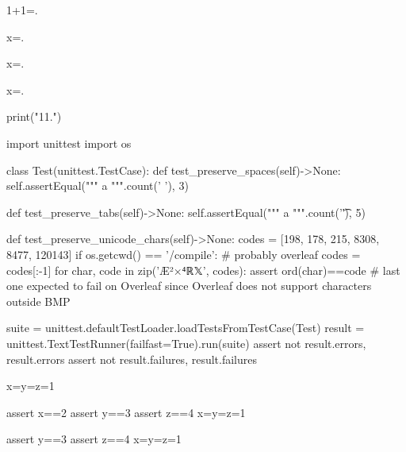 \documentclass[a5paper]{article}
\begin{document}
1+1=.


x=.


x=.  %

x=.  %

\begin{pycode}
print("11.\n")
\end{pycode}

\begin{pycode}
\end{pycode}


\begin{pycode}

import unittest
import os

class Test(unittest.TestCase):
	def test_preserve_spaces(self)->None:
		self.assertEqual("""
  a 
""".count(' '), 3)

	def test_preserve_tabs(self)->None:
		self.assertEqual("""
		a			
""".count('\t'), 5)

	def test_preserve_unicode_chars(self)->None:
		codes = [198, 178, 215, 8308, 8477, 120143]
		if os.getcwd() == '/compile':
			# probably overleaf
			codes = codes[:-1]
		for char, code in zip('Æ²×⁴ℝ𝕏', codes):
			assert ord(char)==code  # last one expected to fail on Overleaf since Overleaf does not support characters outside BMP

suite = unittest.defaultTestLoader.loadTestsFromTestCase(Test)
result = unittest.TextTestRunner(failfast=True).run(suite)
assert not result.errors, result.errors
assert not result.failures, result.failures


x=y=z=1
\end{pycode}

\def\testFilePath{helper_file.py}
\def\letYThree{y=3}
\def\letZFour{z=4}

\pyfile{\testFilePath}  %
\pyc{\letYThree}
\pycq{\letZFour}

\begin{pycode}
assert x==2
assert y==3
assert z==4
x=y=z=1
\end{pycode}


\begin{pycode}
assert y==3
assert z==4
x=y=z=1
\end{pycode}
\end{document}
